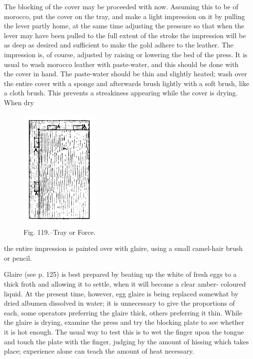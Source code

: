 \documentclass[twoside]{book}
\begin{document}
The blocking of the cover may be proceeded with
now. Assuming this to be of morocco, put the cover
on the tray, and make a light impression on it by
pulling the lever partly home, at the same time
adjusting the pressure so that when the lever may have
been pulled to the full extent of the stroke the
impression will be as deep as desired and sufficient to
\pagebreak
make the gold adhere to the leather. The impression
is, of course, adjusted by raising or lowering the bed
of the press. It is usual to wash morocco leather
with paste-water, and this should be done with the
cover in hand. The paste-water should be thin and
slightly heated; wash over the entire cover with a
sponge and afterwards brush lightly with a soft
brush, like a cloth brush. This prevents a streakiness
appearing while the cover is drying. When dry
	\begin{figure}[h]
		\centering
		\includegraphics[width=0.35\textwidth]{Figures/_119.png}
		\caption*{Fig. 119.--Tray or Force.}
	\end{figure}
the entire impression is painted over with glaire,
using a small camel-hair brush or pencil.

Glaire (see p. 125) is best prepared by beating up
the white of fresh eggs to a thick froth and allowing
it to settle, when it will become a clear amber-
coloured liquid. At the present time, however,
egg glaire is being replaced somewhat by dried
albumen dissolved in water; it is unnecessary
to give the proportions of each, some operators
preferring the glaire thick, others preferring it thin.
While the glaire is drying, examine the press and
try the blocking plate to see whether it is hot
enough. The usual way to test this is to wet the
finger upon the tongue and touch the plate with the
\pagebreak
finger, judging by the amount of hissing which
takes place; experience alone can teach the amount
of heat necessary.
\end{document}
